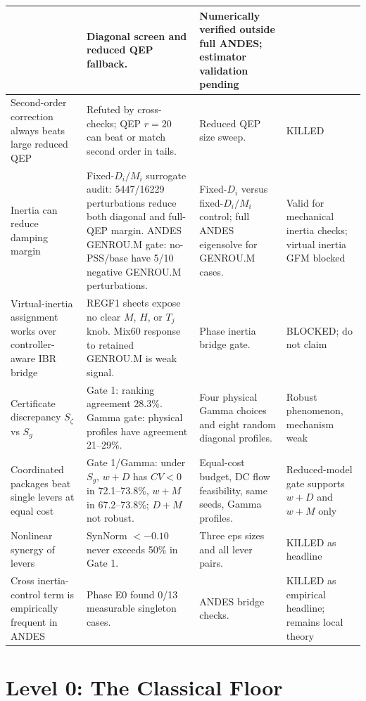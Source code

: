 \documentclass[11pt]{article}
\begin{document}
\begin{longtable}{p{}p{}p{}p{}}
& Diagonal screen and reduced QEP fallback.
& Numerically verified outside full ANDES; estimator validation pending\\
\midrule
Second-order correction always beats large reduced QEP
& Refuted by cross-checks; QEP $r=20$ can beat or match second order in tails.
& Reduced QEP size sweep.
& KILLED\\
\midrule
Inertia can reduce damping margin
& Fixed-$D_i/M_i$ surrogate audit: 5447/16229 perturbations reduce both diagonal and full-QEP margin. ANDES GENROU.M gate: no-PSS/base have 5/10 negative GENROU.M perturbations.
& Fixed-$D_i$ versus fixed-$D_i/M_i$ control; full ANDES eigensolve for GENROU.M cases.
& Valid for mechanical inertia checks; virtual inertia GFM blocked\\
\midrule
Virtual-inertia assignment works over controller-aware IBR bridge
& REGF1 sheets expose no clear $M$, $H$, or $T_j$ knob. Mix60 response to retained GENROU.M is weak signal.
& Phase inertia bridge gate.
& BLOCKED; do not claim\\
\midrule
Certificate discrepancy $S_\zeta$ vs $S_g$
& Gate 1: ranking agreement 28.3\%. Gamma gate: physical profiles have agreement 21--29\%.
& Four physical Gamma choices and eight random diagonal profiles.
& Robust phenomenon, mechanism weak\\
\midrule
Coordinated packages beat single levers at equal cost
& Gate 1/Gamma: under $S_g$, $w+D$ has $CV<0$ in 72.1--73.8\%, $w+M$ in 67.2--73.8\%; $D+M$ not robust.
& Equal-cost budget, DC flow feasibility, same seeds, Gamma profiles.
& Reduced-model gate supports $w+D$ and $w+M$ only\\
\midrule
Nonlinear synergy of levers
& SynNorm $<-0.10$ never exceeds 50\% in Gate 1.
& Three eps sizes and all lever pairs.
& KILLED as headline\\
\midrule
Cross inertia-control term is empirically frequent in ANDES
& Phase E0 found 0/13 measurable singleton cases.
& ANDES bridge checks.
& KILLED as empirical headline; remains local theory\\
\bottomrule
\end{longtable}

\section{Level 0: The Classical Floor}
\end{document}
